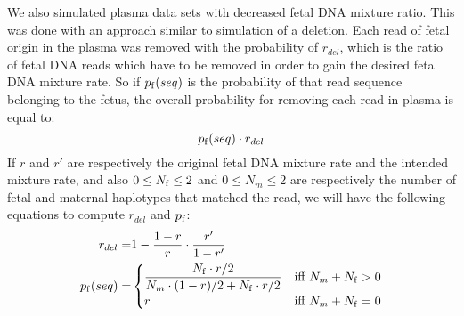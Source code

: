 	We also simulated plasma data sets with decreased fetal DNA mixture ratio. This was done with an approach similar to simulation of a deletion. Each read of fetal origin in the plasma was removed with the probability of $r_{del}$, which is the ratio of fetal DNA reads which have to be removed in order to gain the desired fetal DNA mixture rate. So if $p_{\mathrm{f}}(seq)$ is the probability of that read sequence belonging to the fetus, the overall probability for removing each read in plasma is equal to:
	 $$p_{\mathrm{f}}(seq) \cdot r_{del}$$
	 If $r$ and $r'$ are respectively the original fetal DNA mixture rate and the intended mixture rate, and also $0 \leq N_{\mathrm{f}} \leq 2$ and $0 \leq N_m \leq 2$ are respectively the number of fetal and maternal haplotypes that matched the read, we will have the following equations to compute $r_{del}$ and $p_{\mathrm{f}}$:
\begin{align*}
r_{del} =& 1 - \frac{1-r}{r} \cdot \frac{r'}{1-r'}  \\
p_\f(seq) =& 
  \begin{cases}
    \mathlarger{\frac{ N_\f \cdot r/2 }{ N_m \cdot (1-r)/2 + N_\f \cdot r/2}} & \text{iff } N_m+N_\f>0 \\
    r & \text{iff } N_m+N_\f=0
  \end{cases}
\end{align*}

